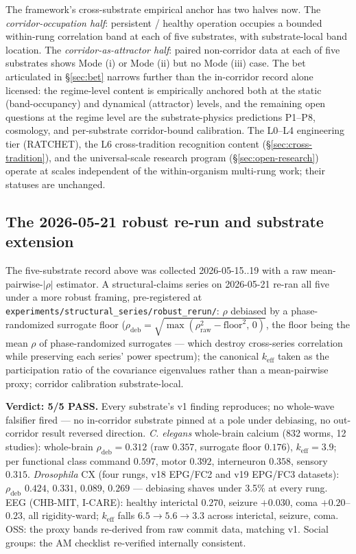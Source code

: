 \documentclass[11pt,a4paper]{article}
\newcommand{\keff}{k_{\text{eff}}}
\begin{document}
The framework's cross-substrate empirical anchor has two halves now. The \emph{corridor-occupation half}: persistent / healthy operation occupies a bounded within-rung correlation band at each of five substrates, with substrate-local band location. The \emph{corridor-as-attractor half}: paired non-corridor data at each of five substrates shows Mode (i) or Mode (ii) but no Mode (iii) case. The bet articulated in \S\ref{sec:bet} narrows further than the in-corridor record alone licensed: the regime-level content is empirically anchored both at the static (band-occupancy) and dynamical (attractor) levels, and the remaining open questions at the regime level are the substrate-physics predictions P1--P8, cosmology, and per-substrate corridor-bound calibration. The L0--L4 engineering tier (RATCHET), the L6 cross-tradition recognition content (\S\ref{sec:cross-tradition}), and the universal-scale research program (\S\ref{sec:open-research}) operate at scales independent of the within-organism multi-rung work; their statuses are unchanged.

\subsection*{The 2026-05-21 robust re-run and substrate extension}\label{sec:robust-rerun}

The five-substrate record above was collected 2026-05-15..19 with a raw mean-pairwise-$|\rho|$ estimator. A structural-claims series on 2026-05-21 re-ran all five under a more robust framing, pre-registered at \texttt{experiments/structural\_series/robust\_rerun/}: $\rho$ debiased by a phase-randomized surrogate floor ($\rho_{\text{deb}} = \sqrt{\max(\rho_{\text{raw}}^2 - \text{floor}^2,\,0)}$, the floor being the mean $\rho$ of phase-randomized surrogates --- which destroy cross-series correlation while preserving each series' power spectrum); the canonical $\keff$ taken as the participation ratio of the covariance eigenvalues rather than a mean-pairwise proxy; corridor calibration substrate-local.

\textbf{Verdict: 5/5 PASS.} Every substrate's v1 finding reproduces; no whole-wave falsifier fired --- no in-corridor substrate pinned at a pole under debiasing, no out-corridor result reversed direction. \emph{C. elegans} whole-brain calcium (832 worms, 12 studies): whole-brain $\rho_{\text{deb}} = 0.312$ (raw $0.357$, surrogate floor $0.176$), $\keff = 3.9$; per functional class command $0.597$, motor $0.392$, interneuron $0.358$, sensory $0.315$. \emph{Drosophila} CX (four rungs, v18 EPG/FC2 and v19 EPG/FC3 datasets): $\rho_{\text{deb}}$ $0.424$, $0.331$, $0.089$, $0.269$ --- debiasing shaves under 3.5\% at every rung. EEG (CHB-MIT, I-CARE): healthy interictal $0.270$, seizure $+0.030$, coma $+0.20$--$0.23$, all rigidity-ward; $\keff$ falls $6.5 \to 5.6 \to 3.3$ across interictal, seizure, coma. OSS: the proxy bands re-derived from raw commit data, matching v1. Social groups: the AM checklist re-verified internally consistent.
\end{document}
